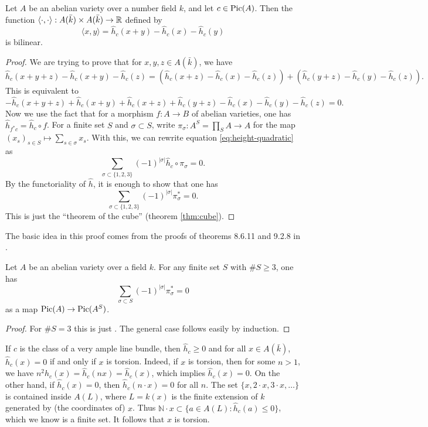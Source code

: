 \documentclass{article}
\begin{document}
\begin{lemma}\label{lem:height-quadratic}
Let $A$ be an abelian variety over a number field $k$, and let $c\in \operatorname{Pic}(A)$. 
Then the function 
$\langle \cdot,\cdot\rangle:A(\bar k)\times A(\bar k)\to \mathbb{R}$ defined by 
\[
  \langle x,y\rangle = \widehat h_c(x+y)-\widehat h_c(x)-\widehat h_c(y)
\]
is bilinear. 
\end{lemma}
\begin{proof}
We are trying to prove that for $x,y,z\in A(\bar k)$, we have 
\[
  \widehat h_c(x+y+z)-\widehat h_c(x+y)-\widehat h_c(z) = \left(\widehat h_c(x+z)-\widehat h_c(x)-\widehat h_c(z)\right) + \left(\widehat h_c(y+z)-\widehat h_c(y)-\widehat h_c(z)\right) \text{.}
\]
This is equivalent to 
\begin{equation}\label{eq:height-quadratic}
  -\widehat h_c(x+y+z)+\widehat h_c(x+y)+\widehat h_c(x+z)+\widehat h_c(y+z)-\widehat h_c(x)-\widehat h_c(y)-\widehat h_c(z) = 0 \text{.}
\end{equation}
Now we use the fact that for a morphism $f:A\to B$ of abelian varieties, one has 
$\widehat h_{f^\ast c}=\widehat h_c\circ f$. For a finite set $S$ and 
$\sigma\subset S$, write $\pi_\sigma:A^S=\prod_S A\to A$ for the map 
$(x_s)_{s\in S}\mapsto \sum_{s\in\sigma} x_s$. With this, we can rewrite 
equation \eqref{eq:height-quadratic} as 
\[
  \sum_{\sigma\subset \{1,2,3\}} (-1)^{|\sigma|}\widehat h_c\circ \pi_\sigma = 0 \text{.}
\]
By the functoriality of $\widehat h$, it is enough to show that one has 
\[
  \sum_{\sigma\subset \{1,2,3\}} (-1)^{|\sigma|} \pi_\sigma^\ast = 0 \text{.}
\]
This is just the ``theorem of the cube'' (theorem \ref{thm:cube}). 
\end{proof}

The basic idea in this proof comes from the proofs of theorems 8.6.11 and 
9.2.8 in \cite{bg06}. 

\begin{theorem}\label{thm:cube}
Let $A$ be an abelian variety over a field $k$. For any finite set $S$ with 
$\# S\geqslant 3$, one has 
\[
  \sum_{\sigma\subset S} (-1)^{|\sigma|} \pi_\sigma^\ast = 0
\]
as a map $\operatorname{Pic}(A)\to \operatorname{Pic}(A^S)$. 
\end{theorem}
\begin{proof}
For $\# S=3$ this is just \cite[III.10]{mu08}. The general case follows easily 
by induction. 
\end{proof}



If $c$ is the class of a very ample line bundle, then 
$\widehat h_c\geqslant 0$ and for all $x\in A(\bar k)$, 
$\widehat h_c(x)=0$ if and only if $x$ is torsion. 
Indeed, if $x$ is torsion, then for some $n>1$, we have 
$n^2 \widehat h_c(x)=\widehat h_c(n x)=\widehat h_c(x)$, which implies 
$\widehat h_c(x)=0$. On the other hand, if $\widehat h_c(x)=0$, then 
$\widehat h_c(n\cdot x)=0$ for all $n$. The set 
$\{x,2\cdot x,3\cdot x,\dots\}$ is contained inside $A(L)$, where $L=k(x)$ is 
the finite extension of $k$ generated by (the coordinates of) $x$. Thus 
$\mathbb{N}\cdot x\subset \{a\in A(L):\widehat h_c(a)\leqslant 0\}$, which we 
know is a finite set. It follows that $x$ is torsion. 
\end{document}
